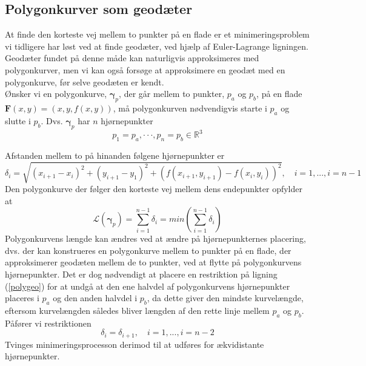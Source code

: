 \subsection{Polygonkurver som geodæter}
At finde den korteste vej mellem to punkter på en flade er et minimeringsproblem vi tidligere har løst ved at finde geodæter, ved hjælp af Euler-Lagrange ligningen. Geodæter fundet på denne måde kan naturligvis approksimeres med polygonkurver, men vi kan også forsøge at approksimere en geodæt med en polygonkurve, før selve geodæten er kendt. \\
Ønsker vi en polygonkurve, \(\pmb{\gamma}_p\), der går mellem to punkter, \(p_a\) og \(p_b\), på en flade \(\pmb{F}(x,y)=(x,y,f(x,y))\), må polygonkurven nødvendigvis starte i \(p_a\) og slutte i \(p_b\). Dvs. \(\pmb{\gamma}_p\) har \(n\) hjørnepunkter 
\begin{equation}
p_1=p_a, \cdot\cdot\cdot, p_n=p_b \in \mathbb{R}^3
\end{equation}

Afstanden mellem to på hinanden følgene hjørnepunkter er
\begin{equation}
\delta_i = \sqrt{\left(x_{i+1}-x_i\right)^2+\left(y_{i+1}-y_1\right)^2+\left(f\left(x_{i+1},y_{i+1}\right) - f\left(x_i,y_i\right)\right)^2}, \quad i=1,...,i=n-1
\label{deltai}
\end{equation}
Den polygonkurve der følger den korteste vej mellem dens endepunkter opfylder at
\begin{equation}
\mathscr{L}(\pmb{\gamma}_p)=\sum\limits_{i=1}^{n-1}\delta_i=min\left(\sum\limits_{i=1}^{n-1}\delta_i\right)
\label{polymini}
\end{equation}
Polygonkurvens længde kan ændres ved at ændre på hjørnepunkternes placering, dvs. der kan konstrueres en polygonkurve mellem to punkter på en flade, der approksimerer geodæten mellem de to punkter, ved at flytte på polygonkurvens hjørnepunkter. Det er dog nødvendigt at placere en restriktion på ligning (\ref{polygeo}) for at undgå at den ene halvdel af polygonkurvens hjørnepunkter placeres i \(p_a\) og den anden halvdel i \(p_b\), da dette giver den mindste kurvelængde, eftersom kurvelængden således bliver længden af den rette linje mellem \(p_a\) og \(p_b\). \\



Påfører vi restriktionen
\begin{equation}
\delta_i = \delta_{i+1}, \quad i=1,...,i=n-2
\end{equation}
Tvinges minimeringsprocesson derimod til at udføres for ækvidistante hjørnepunkter.

